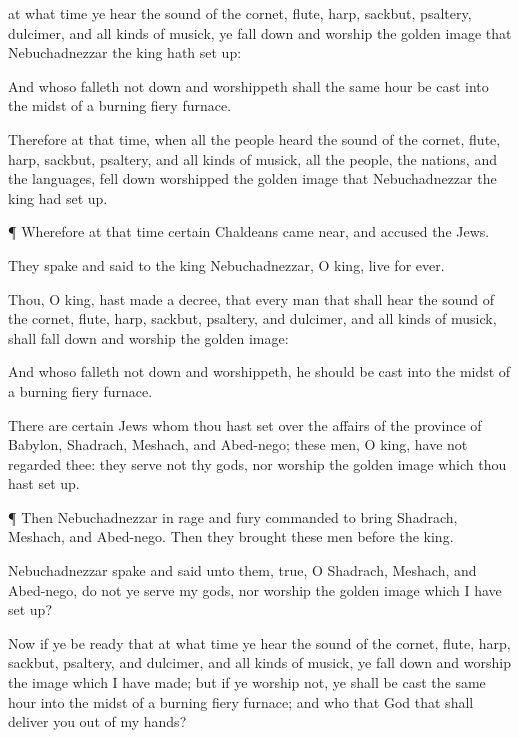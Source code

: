 { at what
time ye
hear the
sound of the
cornet,
flute,
harp,
sackbut,
psaltery,
dulcimer, and
all
kinds of
musick, ye fall
down and
worship the
golden
image that
Nebuchadnezzar the
king hath set
up:

And
whoso
falleth
not
down and
worshippeth shall the same
hour be
cast into the
midst of a
burning
fiery
furnace.

Therefore at that
time,
when
all the
people
heard the
sound of the
cornet,
flute,
harp,
sackbut,
psaltery, and
all
kinds of
musick,
all the
people, the
nations, and the
languages, fell
down
{}
worshipped the
golden
image that
Nebuchadnezzar the
king had set
up.


\par }{\PP {}¶
Wherefore at
that
time
certain
Chaldeans came
near, and
accused the
Jews.

They
spake and
said to the
king
Nebuchadnezzar, O
king,
live for
ever.

Thou, O
king, hast
made a
decree, that
every
man that shall
hear the
sound of the
cornet,
flute,
harp,
sackbut,
psaltery, and
dulcimer, and
all
kinds of
musick, shall fall
down and
worship the
golden
image:

And
whoso
falleth
not
down and
worshippeth,
{} he should be
cast into the
midst of a
burning
fiery
furnace.

There
are
certain
Jews
whom thou hast
set
over the
affairs of the
province of
Babylon,
Shadrach,
Meshach, and
Abed-nego;
these
men, O
king,
have
not
regarded
thee: they
serve
not thy
gods,
nor
worship the
golden
image which thou hast set
up.


\par }{\PP {}¶
Then
Nebuchadnezzar in
{}
rage and
fury
commanded to
bring
Shadrach,
Meshach, and
Abed-nego.
Then they
brought
these
men
before the
king.

Nebuchadnezzar
spake and
said unto them,
{}
true, O
Shadrach,
Meshach, and
Abed-nego, do
not
ye
serve my
gods,
nor
worship the
golden
image which I have
set up?

Now
if ye
be
ready that at what
time ye
hear the
sound of the
cornet,
flute,
harp,
sackbut,
psaltery, and
dulcimer, and
all
kinds of
musick, ye fall
down and
worship the
image which I have
made;
{} but
if ye
worship
not, ye shall be
cast the same
hour into the
midst of a
burning
fiery
furnace; and
who
{} that
God that shall
deliver you out
of my
hands?

}
